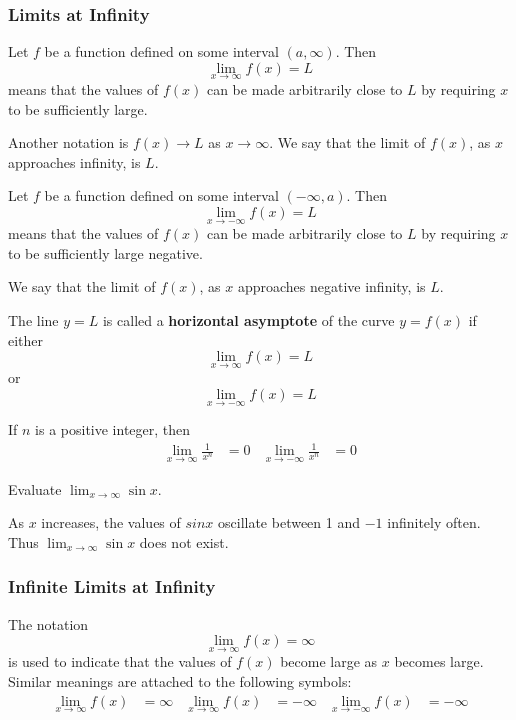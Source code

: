 \subsubsection*{Limits at Infinity}
\begin{definition}
    Let \(f\) be a function defined on some interval \((a,\infty)\).
    Then
    \[\lim_{x\to\infty}f(x)=L\]
    means that the values of \(f(x)\) can be made arbitrarily close to \(L\)
    by requiring \(x\) to be sufficiently large.
\end{definition}
Another notation is \(f(x)\to L\) as \(x\to\infty\).
We say that the limit of \(f(x)\),
as \(x\) approaches infinity,
is \(L\).
\begin{definition}
    Let \(f\) be a function defined on some interval \((-\infty,a)\).
    Then
    \[\lim_{x\to-\infty}f(x)=L\]
    means that the values of \(f(x)\) can be made arbitrarily close to \(L\) by requiring
    \(x\) to be sufficiently large negative.
\end{definition}
We say that the limit of \(f(x)\),
as \(x\) approaches negative infinity,
is \(L\).
\begin{definition}
    The line \(y=L\) is called a \textbf{horizontal asymptote} of the curve
    \(y=f(x)\) if either
    \[\lim_{x\to\infty}f(x)=L\]
    or
    \[\lim_{x\to-\infty}f(x)=L\]
\end{definition}
If \(n\) is a positive integer,
then
\begin{align*}
    \lim_{x\to\infty}\frac{1}{x^n} &= 0 & \lim_{x\to-\infty}\frac{1}{x^n} &= 0
\end{align*}
\begin{problem}
    Evaluate \(\displaystyle{\lim_{x\to\infty}\sin x}\).
\end{problem}
\begin{solution}
    As \(x\) increases,
    the values of \(sin x\) oscillate between 1 and \(-1\) infinitely often.
    Thus \(\displaystyle{\lim_{x\to\infty}\sin x}\) does not exist.
\end{solution}

\subsubsection*{Infinite Limits at Infinity}
The notation
\[\lim_{x\to\infty}f(x)=\infty\]
is used to indicate that the values of \(f(x)\) become large as \(x\) becomes
large.
Similar meanings are attached to the following symbols:
\begin{align*}
    \lim_{x\to\infty}f(x) &= \infty & \lim_{x\to\infty}f(x) &= -\infty
    & \lim_{x\to-\infty}f(x) &= -\infty
\end{align*}

